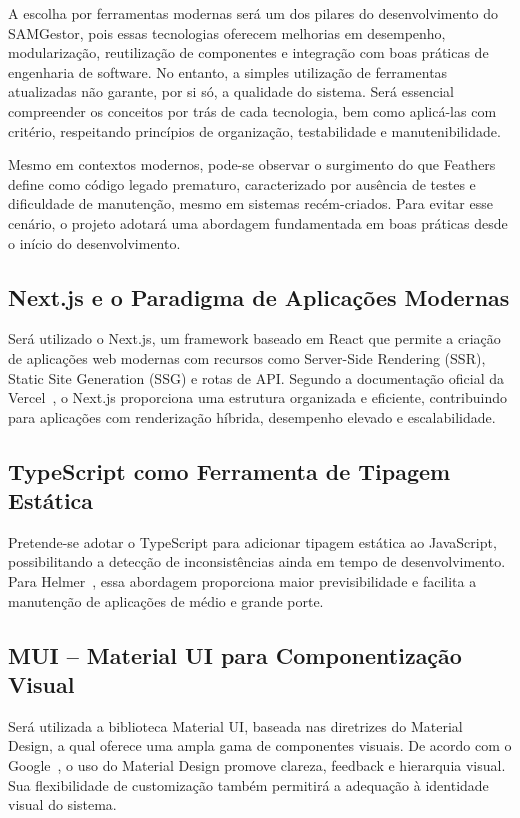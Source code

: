 A escolha por ferramentas modernas será um dos pilares do desenvolvimento do SAMGestor, pois essas tecnologias oferecem melhorias em desempenho, modularização, reutilização de componentes e integração com boas práticas de engenharia de software. No entanto, a simples utilização de ferramentas atualizadas não garante, por si só, a qualidade do sistema. Será essencial compreender os conceitos por trás de cada tecnologia, bem como aplicá-las com critério, respeitando princípios de organização, testabilidade e manutenibilidade.

Mesmo em contextos modernos, pode-se observar o surgimento do que Feathers~\cite{feathers2004} define como código legado prematuro, caracterizado por ausência de testes e dificuldade de manutenção, mesmo em sistemas recém-criados. Para evitar esse cenário, o projeto adotará uma abordagem fundamentada em boas práticas desde o início do desenvolvimento.

\subsection{Next.js e o Paradigma de Aplicações Modernas}

Será utilizado o Next.js, um framework baseado em React que permite a criação de aplicações web modernas com recursos como Server-Side Rendering (SSR), Static Site Generation (SSG) e rotas de API. Segundo a documentação oficial da Vercel~\cite{vercel2025}, o Next.js proporciona uma estrutura organizada e eficiente, contribuindo para aplicações com renderização híbrida, desempenho elevado e escalabilidade.

\subsection{TypeScript como Ferramenta de Tipagem Estática}

Pretende-se adotar o TypeScript para adicionar tipagem estática ao JavaScript, possibilitando a detecção de inconsistências ainda em tempo de desenvolvimento. Para Helmer~\cite{helmer2021}, essa abordagem proporciona maior previsibilidade e facilita a manutenção de aplicações de médio e grande porte.

\subsection{MUI – Material UI para Componentização Visual}

Será utilizada a biblioteca Material UI, baseada nas diretrizes do Material Design, a qual oferece uma ampla gama de componentes visuais. De acordo com o Google~\cite{google2021}, o uso do Material Design promove clareza, feedback e hierarquia visual. Sua flexibilidade de customização também permitirá a adequação à identidade visual do sistema.

